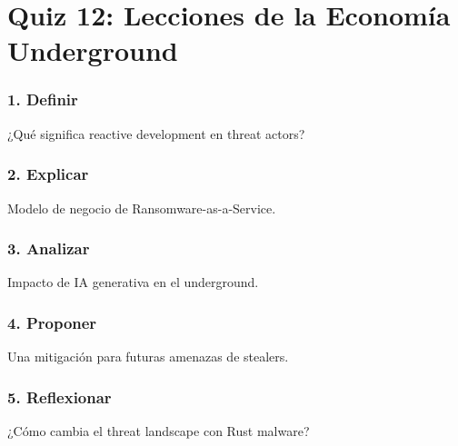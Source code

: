 \documentclass[
  letterpaper,
]{report}
\begin{document}
\chapter{Quiz 12: Lecciones de la Economía
Underground}\label{quiz-12-lecciones-de-la-economuxeda-underground-1}

\subsection{1. Definir}\label{definir-1}

¿Qué significa reactive development en threat actors?

\subsection{2. Explicar}\label{explicar-7}

Modelo de negocio de Ransomware-as-a-Service.

\subsection{3. Analizar}\label{analizar-4}

Impacto de IA generativa en el underground.

\subsection{4. Proponer}\label{proponer}

Una mitigación para futuras amenazas de stealers.

\subsection{5. Reflexionar}\label{reflexionar}

¿Cómo cambia el threat landscape con Rust malware?
\end{document}
